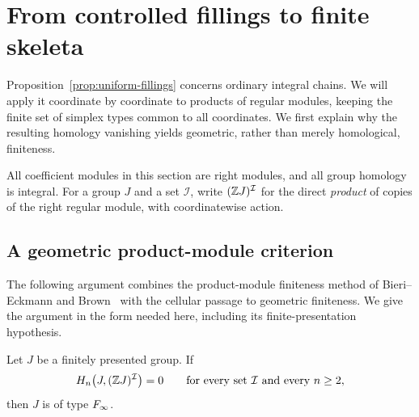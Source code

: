 \section{From controlled fillings to finite skeleta}
\label{sec:products}

Proposition~\ref{prop:uniform-fillings} concerns ordinary integral
chains.  We will apply it coordinate by coordinate to products of
regular modules, keeping the finite set of simplex types common to
all coordinates.  We first explain why the resulting homology
vanishing yields geometric, rather than merely homological,
finiteness.

All coefficient modules in this section are right modules, and all
group homology is integral.  For a group $J$ and a set $\mathcal I$,
write $(\mathbb Z J)^{\mathcal I}$ for the direct \emph{product} of copies
of the right regular module, with coordinatewise action.

\subsection{A geometric product-module criterion}

The following argument combines the product-module finiteness method of
Bieri--Eckmann and Brown~\cite{BieriEckmann1974,Brown1975} with the
cellular passage to geometric finiteness.  We give the argument in the
form needed here, including its finite-presentation hypothesis.

\begin{lemma}\label{lem:product-criterion}
Let $J$ be a finitely presented group.  If
\[
 H_n\bigl(J,(\mathbb Z J)^{\mathcal I}\bigr)=0
 \qquad\text{for every set }\mathcal I\text{ and every }n\ge2,
\]
then $J$ is of type $F_\infty$.
\end{lemma}

